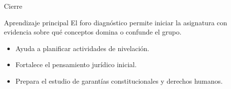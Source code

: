 \documentclass[
  spanish,
  aspectratio=169,
  xcolor={dvipsnames,table}
]{beamer}
\begin{document}
\begin{frame}{Cierre}
  \begin{block}{Aprendizaje principal}
    El foro diagnóstico permite iniciar la asignatura con evidencia sobre qué conceptos domina o confunde el grupo.
  \end{block}
  \begin{itemize}
    \item Ayuda a planificar actividades de nivelación.
    \item Fortalece el pensamiento jurídico inicial.
    \item Prepara el estudio de garantías constitucionales y derechos humanos.
  \end{itemize}
\end{frame}
\end{document}
